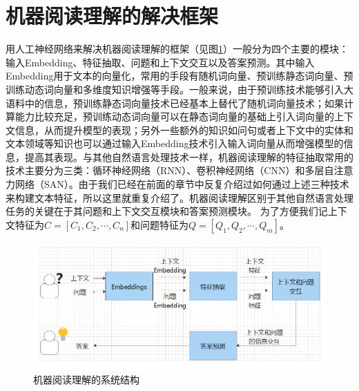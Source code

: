 \documentclass[twoside,a4paper,12pt]{book}%
\begin{document}
\section{机器阅读理解的解决框架}
用人工神经网络来解决机器阅读理解的框架（见图\ref{fig:mrc}）一般分为四个主要的模块：输入Embedding、特征抽取、问题和上下文交互以及答案预测。其中输入Embedding用于文本的向量化，常用的手段有随机词向量、预训练静态词向量、预训练动态词向量和多维度知识增强等手段。一般来说，由于预训练技术能够引入大语料中的信息，预训练静态词向量技术已经基本上替代了随机词向量技术；如果计算能力比较充足，预训练动态词向量可以在静态词向量的基础上引入词向量的上下文信息，从而提升模型的表现；另外一些额外的知识如问句或者上下文中的实体和文本领域等知识也可以通过输入Embedding技术引入输入词向量从而增强模型的信息，提高其表现。与其他自然语言处理技术一样，机器阅读理解的特征抽取常用的技术主要分为三类：循环神经网络（\gls{RNN}）、卷积神经网络（\gls{CNN}）和多层自注意力网络（\gls{SAN}）。由于我们已经在前面的章节中反复介绍过如何通过上述三种技术来构建文本特征，所以这里就重复介绍了。机器阅读理解区别于其他自然语言处理任务的关键在于其问题和上下文交互模块和答案预测模块。
为了方便我们记上下文特征为$C=[C_1,C_2,\cdots,C_n]$和问题特征为$Q=[Q_1,Q_2,\cdots,Q_m]$。
\begin{figure}[htbp]
\begin{center}
\includegraphics[width=5.6in]{figures/mrc.png}
\caption{机器阅读理解的系统结构}
\label{fig:mrc}
\end{center}
\end{figure}
\end{document}
